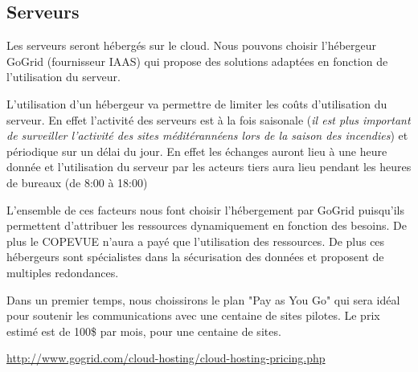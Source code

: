 \subsection{Serveurs}

Les serveurs seront hébergés sur le cloud. Nous pouvons choisir l'hébergeur GoGrid (fournisseur IAAS) 
qui propose des solutions adaptées en fonction de l'utilisation du serveur.

L'utilisation d'un hébergeur va permettre de limiter les coûts
d'utilisation du serveur.  En effet l'activité des serveurs est à la fois
saisonale 
(\textit{il est plus important de surveiller l'activité des sites méditérannéens lors de la saison des incendies}) et
périodique sur un délai du jour. En effet les échanges auront lieu à une
heure donnée et l'utilisation du serveur par les acteurs tiers aura lieu
pendant les heures de bureaux (de 8:00 à 18:00)

L'ensemble de ces facteurs nous font choisir l'hébergement par GoGrid
puisqu'ils permettent d'attribuer les ressources dynamiquement en fonction
des besoins. De plus le COPEVUE n'aura a payé que l'utilisation des
ressources. De plus ces hébergeurs sont spécialistes dans la sécurisation
des données et proposent de multiples redondances. 

Dans un premier temps, nous choissirons le plan "Pay as You Go" qui sera
idéal pour soutenir les communications avec une centaine de sites pilotes.
Le prix estimé est de 100\$ par mois, pour une centaine de sites.

\url{http://www.gogrid.com/cloud-hosting/cloud-hosting-pricing.php}

